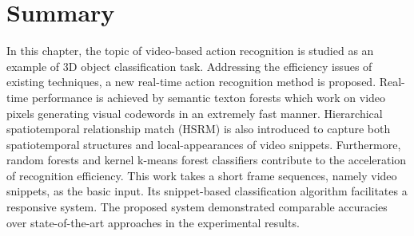 \section{Summary}
\label{sec/act/discussion}
In this chapter, the topic of video-based action recognition is studied as an example of 3D object classification task. 
Addressing the efficiency issues of existing techniques, a new real-time action recognition method is proposed. 
Real-time performance is achieved by semantic texton forests which work on video pixels generating visual codewords in an extremely fast manner. Hierarchical spatiotemporal relationship match (HSRM) is also introduced to capture both spatiotemporal structures and local-appearances of video snippets. 
Furthermore, random forests and kernel k-means forest classifiers contribute to the acceleration of recognition efficiency. 
This work takes a short frame sequences, namely video snippets, as the basic input. Its snippet-based classification algorithm facilitates a responsive system. 
The proposed system demonstrated comparable accuracies over state-of-the-art approaches in the experimental results. 
